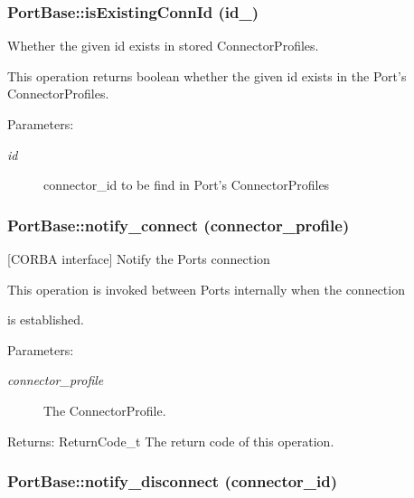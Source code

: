 \subsubsection{\setlength{\rightskip}{0pt plus 5cm}Port\-Base::is\-Existing\-Conn\-Id (id\_\-)}\label{classPortBase_PortBasea20}


Whether the given id exists in stored Connector\-Profiles. 

This operation returns boolean whether the given id exists in the Port's Connector\-Profiles.

\begin{Desc}
\item[Parameters:]
\begin{description}
\item[{\em id}]connector\_\-id to be find in Port's Connector\-Profiles\end{description}
\end{Desc}
\subsubsection{\setlength{\rightskip}{0pt plus 5cm}Port\-Base::notify\_\-connect (connector\_\-profile)}\label{classPortBase_PortBasea6}


[CORBA interface] Notify the Ports connection 

This operation is invoked between Ports internally when the connection

is established.

\begin{Desc}
\item[Parameters:]
\begin{description}
\item[{\em connector\_\-profile}]The Connector\-Profile. \end{description}
\end{Desc}
\begin{Desc}
\item[Returns:]Return\-Code\_\-t The return code of this operation.\end{Desc}
\subsubsection{\setlength{\rightskip}{0pt plus 5cm}Port\-Base::notify\_\-disconnect (connector\_\-id)}\label{classPortBase_PortBasea8}


